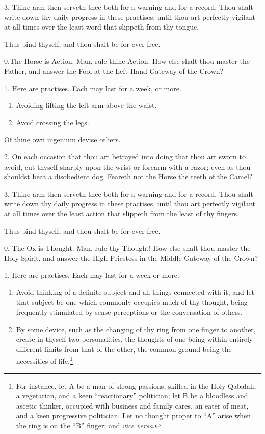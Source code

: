 3. Thine arm then serveth thee both for a warning and for a record. Thou shalt write down thy daily progress in these practises, until thou art perfectly vigilant at all times over the least word that slippeth from thy tongue.

Thus bind thyself, and thou shalt be for ever free.

0.The Horse is Action. Man, rule thine Action. How else shalt thou master the Father, and answer the Fool at the Left Hand Gateway of the Crown?

1. Here are practises. Each may last for a week, or more.

\begin{enumerate}[label=\greek*.]
\item Avoiding lifting the left arm above the waist.

\item Avoid crossing the legs.
\end{enumerate}

Of thine own ingenium devise others.

2. On each occasion that thou art betrayed into doing that thou art sworn to avoid, cut thyself sharply upon the wrist or forearm with a razor; even as thou shouldst beat a disobedient dog. Feareth not the Horse the teeth of the Camel?

3. Thine arm then serveth thee both for a warning and for a record. Thou shalt write down thy daily progress in these practises, until thou art perfectly vigilant at all times over the least action that slippeth from the least of thy fingers.

Thus bind thyself, and thou shalt be for ever free. 

0. The Ox is Thought. Man, rule thy Thought! How else shalt thou master the Holy Spirit, and answer the High Priestess in the Middle Gateway of the Crown?

1. Here are practises. Each may last for a week or more.

\begin{enumerate}[label=\greek*.]
\item Avoid thinking of a definite subject and all things connected with it, and let that subject be one which commonly occupies much of thy thought, being frequently stimulated by sense-perceptions or the conversation of others.

\item By some device, such as the changing of thy ring from one finger to another, create in thyself two personalities, the thoughts of one being within entirely different limits from that of the other, the common ground being the necessities of life.\footnote{For instance, let A be a man of strong passions, skilled in the Holy Qabalah, a vegetarian, and a keen \enquote{reactionary} politician; let B be a bloodless and ascetic thinker, occupied with business and family cares, an eater of meat, and a keen progressive politician. Let no thought proper to \enquote{A} arise when the ring is on the \enquote{B} finger; and \textit{vice versa}.}
\end{enumerate}

